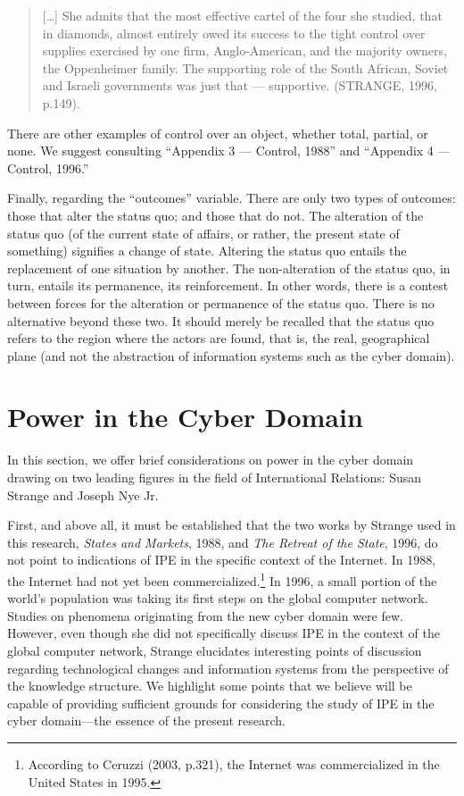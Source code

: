 \begin{quote}
{[}\ldots{]} She admits that the most effective cartel of the four she studied, that in diamonds, almost entirely owed its success to the tight control over supplies exercised by one firm, Anglo-American, and the majority owners, the Oppenheimer family. The supporting role of the South African, Soviet and Israeli governments was just that --- supportive. (STRANGE, 1996, p.149).
\end{quote}

There are other examples of control over an object, whether total, partial, or none. We suggest consulting ``Appendix 3 --- Control, 1988'' and ``Appendix 4 --- Control, 1996.''

Finally, regarding the ``outcomes'' variable. There are only two types of outcomes: those that alter the status quo; and those that do not. The alteration of the status quo (of the current state of affairs, or rather, the present state of something) signifies a change of state. Altering the status quo entails the replacement of one situation by another. The non-alteration of the status quo, in turn, entails its permanence, its reinforcement. In other words, there is a contest between forces for the alteration or permanence of the status quo. There is no alternative beyond these two. It should merely be recalled that the status quo refers to the region where the actors are found, that is, the real, geographical plane (and not the abstraction of information systems such as the cyber domain).

\section{Power in the Cyber Domain}

In this section, we offer brief considerations on power in the cyber domain drawing on two leading figures in the field of International Relations: Susan Strange and Joseph Nye Jr.

First, and above all, it must be established that the two works by Strange used in this research, \textit{States and Markets}, 1988, and \textit{The Retreat of the State}, 1996, do not point to indications of IPE in the specific context of the Internet. In 1988, the Internet had not yet been commercialized.\footnote{According to Ceruzzi (2003, p.321), the Internet was commercialized in the United States in 1995.} In 1996, a small portion of the world's population was taking its first steps on the global computer network. Studies on phenomena originating from the new cyber domain were few. However, even though she did not specifically discuss IPE in the context of the global computer network, Strange elucidates interesting points of discussion regarding technological changes and information systems from the perspective of the knowledge structure. We highlight some points that we believe will be capable of providing sufficient grounds for considering the study of IPE in the cyber domain---the essence of the present research.


